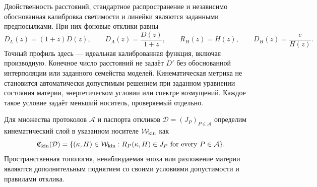 {Двойственность расстояний, стандартное распространение и независимо обоснованная калибровка светимости и линейки являются заданными предпосылками. При них фоновые отклики равны \cite{Hogg}}
\begin{equation}\label{eq:responses}
 D_L(z)=(1+z)D(z),\qquad D_A(z)=\frac{D(z)}{1+z},\qquad
 R_H(z)=H(z),\qquad D_H(z)=\frac c{H(z)}.
\end{equation}
{Точный профиль здесь --- идеальная калиброванная функция, включая производную. Конечное число расстояний не задаёт $D'$ без обоснованной интерполяции или заданного семейства моделей. Кинематическая метрика не становится автоматически допустимым решением при заданном уравнении состояния материи, энергетическом условии или спектре возмущений. Каждое такое условие задаёт меньший носитель, проверяемый отдельно.}
\begin{definition}\label{def:fibre}
{Для множества протоколов $\mathcal A$ и паспорта откликов $\mathcal D=(J_P)_{P\in\mathcal A}$ определим кинематический слой в указанном носителе $\mathcal W_{\rm kin}$ как}
\begin{equation}\label{eq:fibre}
 \mathfrak C_{\rm kin}(\mathcal D)=\{(\kappa,H)\in\mathcal W_{\rm kin}:R_P(\kappa,H)\in J_P\text{ for every }P\in\mathcal A\}.
\end{equation}
{Пространственная топология, ненаблюдаемая эпоха или разложение материи являются дополнительным поднятием со своими условиями допустимости и правилами отклика.}
\end{definition}

